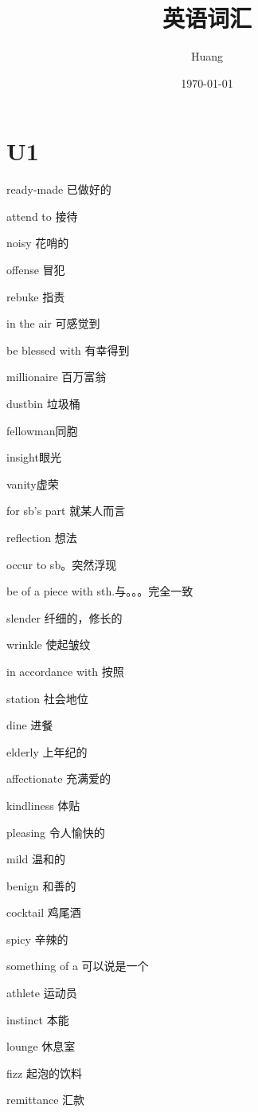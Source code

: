 \documentclass[lang=cn,10pt]{elegantbook}
\title{英语词汇}
\author{ Huang}
\date{\today}
\begin{document}
	
	\maketitle
	\frontmatter
	
	\tableofcontents
	
	\mainmatter
	\chapter{U1}
	ready-made 已做好的
	
	attend to 接待
	
	noisy 花哨的
	
	offense 冒犯
	
	rebuke 指责
	
	in the air 可感觉到
	
	be blessed with 有幸得到
	
	millionaire 百万富翁
	
	dustbin 垃圾桶 
	
	fellowman同胞
	
	insight眼光
	
	vanity虚荣
	
	for sb’s part 就某人而言
	
	reflection 想法
	
	occur to sb。突然浮现
	
	be of a piece with sth.与。。。完全一致
	
	slender 纤细的，修长的
	
	wrinkle 使起皱纹
	
	in accordance with 按照
	
	station 社会地位
	
	dine 进餐
	
	elderly 上年纪的
	
	affectionate 充满爱的
	
	kindliness 体贴
	
	pleasing 令人愉快的
	
	mild 温和的
	
	benign 和善的
	
	cocktail 鸡尾酒
	
	spicy 辛辣的
	
	something of a 可以说是一个
	
	athlete 运动员
	
	instinct 本能
	
	lounge 休息室
	
	fizz 起泡的饮料
	
	remittance 汇款
	
\end{document}
